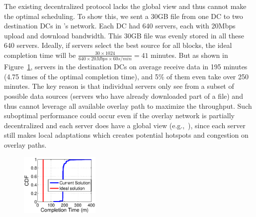 The existing decentralized protocol lacks the global view and thus cannot make the optimal scheduling.
To show this, we sent a 30GB file from one DC to two destination
DCs in \company's network.
Each DC had 640 servers, each with 20Mbps upload and download
bandwidth. This 30GB file was evenly stored in all these
640 servers.
Ideally, if servers select
the best source for all blocks, the ideal
completion time will be
$\frac{30\times 1024}{640\times 20Mbps \times 60s/min} = 41$
minutes. But as shown in Figure~\ref{fig:motivation},
servers in the destination DCs on average receive data in
195 minutes (4.75 times of the optimal completion
time), and 5\% of them even take over 250 minutes.
The key reason is that
individual servers only see from a subset of possible data sources
(servers who have already downloaded part of a file)
and thus cannot leverage all available overlay path to
maximize the throughput.
Such suboptimal performance
could occur even if the overlay
network is partially decentralized and each server does have a
global view (e.g.,~\cite{Huang2014A}),
since each server still makes local adaptations which creates potential
hotspots and congestion on overlay paths.


\begin{figure}[t]
  \centering
  \includegraphics[width=1.5in]{images/SEvsIdeal.eps}
  \vspace{-0.2cm}
  \label{fig:motivation}
\vspace{-0.4cm}
\end{figure}


